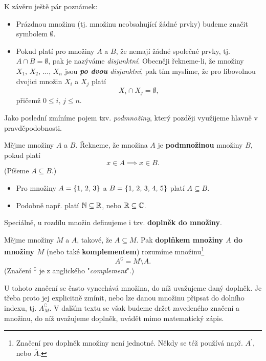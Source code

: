\begin{remark}
    K závěru ještě pár poznámek:
    \begin{itemize}
        \item Prázdnou množinu (tj. množinu neobsahující žádné prvky) budeme značit symbolem $\emptyset$.
        \item Pokud platí pro množiny $A$ a $B$, že nemají žádné společné prvky, tj. $A \cap B=\emptyset$, pak je nazýváme \emph{disjunktní}. Obecněji řekneme-li, že množiny $X_1,\,X_2,\,\dots,\,X_n$ jsou \emph{\textbf{po dvou} disjunktní}, pak tím myslíme, že pro libovolnou dvojici množin $X_i$ a $X_j$ platí
        \begin{equation*}
            X_i \cap X_j = \emptyset,
        \end{equation*}
        přičemž $0 \leqslant i,\,j \leqslant n$.
    \end{itemize}
\end{remark}

Jako poslední zmíníme pojem tzv. \emph{podmnožiny}, který později využijeme hlavně v pravděpodobnosti.

\begin{definition}[Podmnožina]
    Mějme množiny $A$ a $B$. Řekneme, že množina $A$ je \textbf{podmnožinou} množiny $B$, pokud platí
    \[x\in A\implies x\in B.\]
    (Píšeme $A\subseteq B$.)
\end{definition}

\begin{example}
    \begin{itemize}
        \item Pro množiny $A=\left\{1,\,2,\,3\right\}$ a $B=\left\{1,\,2,\,3,\,4,\,5\right\}$ platí $A\subseteq B$.
        \item Podobně např. platí $\mathbb{N}\subseteq\mathbb{R}$, nebo $\mathbb{R}\subseteq\mathbb{C}$.
    \end{itemize}
\end{example}

Speciálně, u rozdílu množin definujeme i tzv. \textbf{doplněk do množiny}.

\begin{definition}
    Mějme množiny $M$ a $A$, takové, že $A\subseteq M$. Pak \textbf{doplňkem množiny $A$ do množiny $M$} (nebo také \textbf{komplementem}) rozumíme množinu\footnote{Značení pro doplněk množiny není jednotné. Někdy se též používá např. $A^\prime$, nebo $\overline{A}$.}
    \[A^\complement=M\setminus A.\]
    (Značení $^\complement$ je z anglického "\emph{complement}".)
\end{definition}

U tohoto značení se často vynechává množina, do níž uvažujeme daný doplněk. Je třeba proto jej explicitně zmínit, nebo lze danou množinu připsat do dolního indexu, tj. $A_M^\complement$. V dalším textu se však budeme držet zavedeného značení a množinu, do níž uvažujeme doplněk, uvádět mimo matematický zápis.